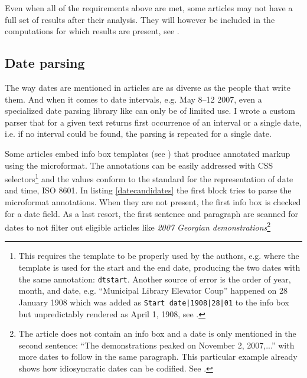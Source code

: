 Even when all of the requirements above are met, some articles may not have a full set of results after their analysis.
They will however be included in the computations for which results are present, see .

\subsection{Date parsing}

The way dates are mentioned in articles are as diverse as the people that write them.
And when it comes to date intervals, e.g. May 8--12 2007, even a specialized date parsing library like  can only be of limited use.
I wrote a custom parser that for a given text returns first occurrence of an interval or a single date, i.e. if no interval could be found, the parsing is repeated for a single date.

Some articles embed info box templates (see ) that produce annotated markup using the  microformat.
The annotations can be easily addressed with \ac{CSS} selectors\footnote{This requires the template to be properly used by the authors, e.g.  where  the template  is used for the start and the end date, producing the two dates with the same annotation: \verb"dtstart". Another source of error is the order of year, month, and date, e.g. ``Municipal Library Elevator Coup'' happened on 28 January 1908 which was added as  \verb"Start date|1908|28|01" to the info box but unpredictably rendered as April 1, 1908, see .} and the values conform to the standard for the representation of date and time, \ac{ISO} 8601.
In listing \ref{datecandidates} the first block tries to parse the microformat annotations.
When they are not present, the first info box is checked for a date field.
As a last resort, the first sentence and paragraph are scanned for dates to not filter out eligible articles like \emph{2007 Georgian demonstrations}\footnote{The article does not contain an info box and a date is only mentioned in the second sentence: ``The demonstrations peaked on November 2, 2007,...'' with more dates to follow in the same paragraph. This particular example already shows how idiosyncratic dates can be codified. See .}

